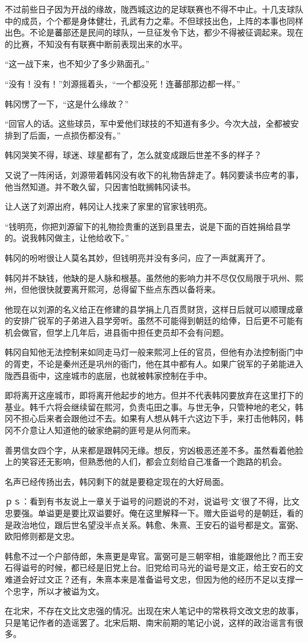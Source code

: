不过前些日子因为开战的缘故，陇西城这边的足球联赛也不得不中止。十几支球队中的成员，个个都是身体健壮，孔武有力之辈。不但球技出色，上阵的本事也同样出色。不论是蕃部还是民间的球队，一旦征发令下达，都少不得被征调起来。现在的比赛，不知没有有联赛中断前表现出来的水平。

“这一战下来，也不知少了多少熟面孔。”

“没有！没有！”刘源摇着头，“一个都没死！连蕃部那边都一样。”

韩冈愣了一下，“这是什么缘故？”

“回官人的话。这些球员，军中爱他们球技的不知道有多少。今次大战，全都被安排到了后面，一点损伤都没有。”

韩冈哭笑不得，球迷、球星都有了，怎么就变成跟后世差不多的样子？

又说了一阵闲话，刘源带着韩冈没有收下的礼物告辞走了。韩冈要读书应考的事，他当然知道。并不敢久留，只因害怕耽搁韩冈读书。

让人送了刘源出府，韩冈让人找来了家里的官家钱明亮。

“钱明亮，你把刘源留下的礼物捡贵重的送到县里去，说是下面的百姓捐给县学的。说我韩冈做主，让他给收下。”

韩冈的吩咐很让人莫名其妙，但钱明亮并没有多问，应了一声就离开了。

韩冈并不缺钱，他缺的是人脉和根基。虽然他的影响力并不尽仅仅局限于巩州、熙州，但他很快就要离开熙河，总得留下些点东西以备将来。

他现在以刘源的名义给正在修建的县学捐上几百贯财货，这样日后就可以顺理成章的安排广锐军的子弟进入县学旁听。虽然不可能得到朝廷的给俸，日后更不可能有机会做官，但学上几年后，进县衙中担任吏员却不会有问题。

韩冈自知他无法控制来如同走马灯一般来熙河上任的官员，但他有办法控制衙门中的胥吏，不论是秦州还是巩州的衙门，他在其中都有人。如果广锐军的子弟能进入陇西县衙中，这座城市的底层，也就被韩家控制在手中。

即将离开这座城市，即将离开他起步的地方。但并不代表韩冈要放弃在这里打下的基业。韩千六将会继续留在熙河，负责屯田之事。与世无争，只管种地的老父，韩冈不担心后来者会跟他过不去。如果有人想从韩千六这边下手，来打击他韩冈，韩冈不介意让人知道他的破家绝嗣的匪号是从何而来。

善男信女四个字，从来都是跟韩冈无缘。想反，穷凶极恶还差不多。虽然看着他脸上的笑容还无影响，但熟悉他的人们，都会立刻给自己准备一个跑路的机会。

名声已经传扬出去，韩冈剩下的就是要稳定现在的大好局面。

ｐｓ：看到有书友说上一章关于谥号的问题说的不对，说谥号‘文’很了不得，比文忠要强。单谥更是要比双谥要好。俺在这里解释一下。赠大臣谥号的是朝廷，看的是政治地位，跟后世名望没半点关系。韩愈、朱熹、王安石的谥号都是文。富弼、欧阳修则都是文忠。

韩愈不过一个户部侍郎，朱熹更是卑官。富弼可是三朝宰相，谁能跟他比？而王安石得谥号的时候，都已经是旧党上台。旧党给司马光的谥号是文正，给王安石的文难道会好过文正？还有，朱熹本来是准备谥号文忠，但因为他的经历不足以支撑一个忠字，所以才被谥为文。

在北宋，不存在文比文忠强的情况。出现在宋人笔记中的常秩将文改文忠的故事，只是笔记作者的造谣罢了。北宋后期、南宋前期的笔记小说，这样的政治谣言有很多。

